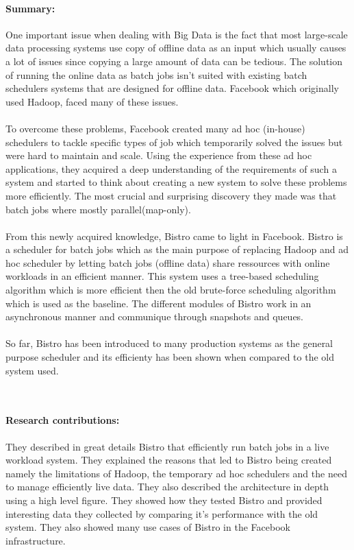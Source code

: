 \documentclass[11pt]{article}
\begin{document}
\paragraph{Summary:} {One important issue when dealing with Big Data is the fact that most large-scale data processing systems use copy of offline data as an input which usually causes a lot of issues since copying a large amount of data can be tedious. The solution of running the online data as batch jobs isn't suited with existing batch schedulers systems that are designed for offline data. Facebook which originally used Hadoop, faced many of these issues. }
\\
\\
{To overcome these problems, Facebook created many ad hoc (in-house) schedulers to tackle specific types of job which temporarily solved the issues but were hard to maintain and scale. Using the experience from these ad hoc applications, they acquired a deep understanding of the requirements of such a system and started to think about creating a new system to solve these problems more efficiently. The most crucial and surprising discovery they made was that batch jobs where mostly parallel(map-only).} 
\\
\\
{From this newly acquired knowledge, Bistro came to light in Facebook. Bistro is a scheduler for batch jobs which as the main purpose of replacing Hadoop and ad hoc scheduler by letting batch jobs (offline data) share ressources with online workloads in an efficient manner. This system uses a tree-based scheduling algorithm which is more efficient then the old brute-force scheduling algorithm which is used as the baseline. The different modules of Bistro work in an asynchronous manner and communique through snapshots and queues.}
\\
\\
{So far, Bistro has been introduced to many production systems as the general purpose scheduler and its efficienty has been shown when compared to the old system used. }

~\newline
\paragraph{Research contributions:} They described in great details Bistro that efficiently run batch jobs in a live workload system. They explained the reasons that led to Bistro being created namely the limitations of Hadoop, the temporary ad hoc schedulers and the need to manage efficiently live data. They also described the architecture in depth using a high level figure. They showed how they tested Bistro and provided interesting data they collected by comparing it's performance with the old system. They also showed many use cases of Bistro in the Facebook infrastructure. 
\\ \\
\end{document}
